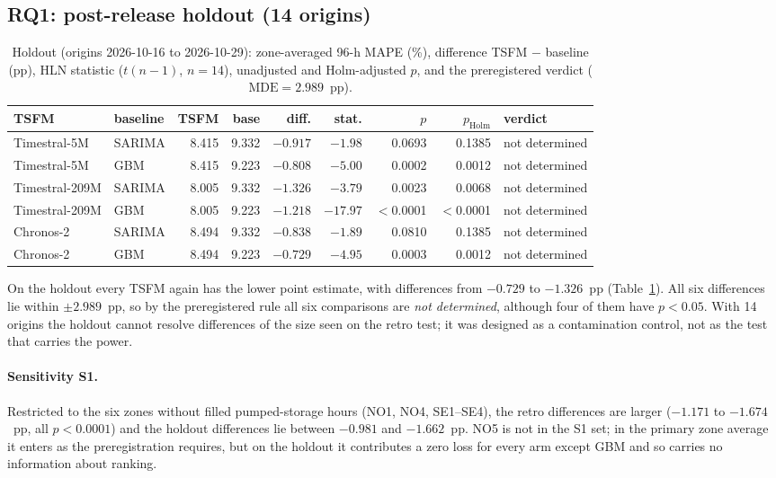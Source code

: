 \subsection{RQ1: post-release holdout (14 origins)}
\begin{table}[t]
\centering
\caption{Holdout (origins 2026-10-16 to 2026-10-29): zone-averaged 96-h MAPE (\%), difference
TSFM $-$ baseline (pp), HLN statistic ($t(n-1)$, $n=14$), unadjusted and Holm-adjusted $p$, and the
preregistered verdict ($\mathrm{MDE}=2.989$~pp).}
\label{tab:holdout}
\small\setlength{\tabcolsep}{4pt}
\begin{tabular}{llrrrrrrl}
\toprule
TSFM & baseline & TSFM & base & diff. & stat. & $p$ & $p_{\mathrm{Holm}}$ & verdict \\
\midrule
Timestral-5M & SARIMA & 8.415 & 9.332 & $-0.917$ & $-1.98$ & 0.0693 & 0.1385 & not determined \\
Timestral-5M & GBM & 8.415 & 9.223 & $-0.808$ & $-5.00$ & 0.0002 & 0.0012 & not determined \\
Timestral-209M & SARIMA & 8.005 & 9.332 & $-1.326$ & $-3.79$ & 0.0023 & 0.0068 & not determined \\
Timestral-209M & GBM & 8.005 & 9.223 & $-1.218$ & $-17.97$ & $<$0.0001 & $<$0.0001 & not determined \\
Chronos-2 & SARIMA & 8.494 & 9.332 & $-0.838$ & $-1.89$ & 0.0810 & 0.1385 & not determined \\
Chronos-2 & GBM & 8.494 & 9.223 & $-0.729$ & $-4.95$ & 0.0003 & 0.0012 & not determined \\
\bottomrule
\end{tabular}
\end{table}

On the holdout every TSFM again has the lower point estimate, with differences from $-0.729$ to
$-1.326$~pp (Table~\ref{tab:holdout}). All six differences lie within $\pm 2.989$~pp, so by the
preregistered rule all six comparisons are \emph{not determined}, although four of them have
$p<0.05$. With 14 origins the holdout cannot resolve differences of the size seen on the retro
test; it was designed as a contamination control, not as the test that carries the power.

\paragraph{Sensitivity S1.} Restricted to the six zones without filled pumped-storage hours
(NO1, NO4, SE1--SE4), the retro differences are larger ($-1.171$ to $-1.674$~pp, all
$p<0.0001$) and the holdout differences lie between $-0.981$ and $-1.662$~pp. NO5 is not in the S1
set; in the primary zone average it enters as the preregistration requires, but on the holdout it
contributes a zero loss for every arm except GBM and so carries no information about ranking.

